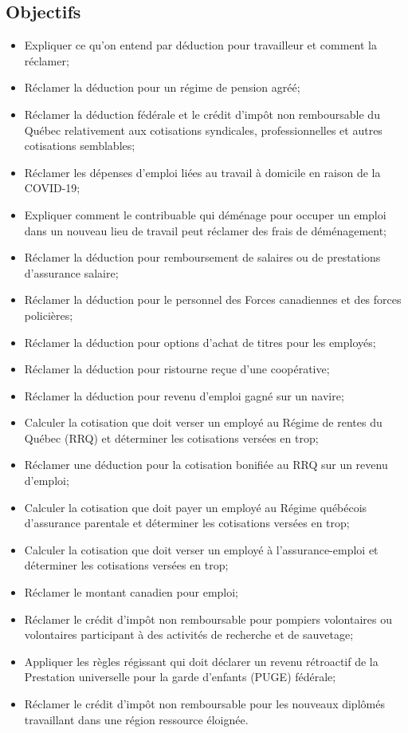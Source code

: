 \subsection{Objectifs}
\begin{itemize}
	\item Expliquer ce qu'on entend par déduction pour travailleur et comment la réclamer;
	\item Réclamer la déduction pour un régime de pension agréé;
	\item Réclamer la déduction fédérale et le crédit d'impôt non remboursable du Québec relativement aux cotisations syndicales, professionnelles et autres cotisations semblables;
	\item Réclamer les dépenses d'emploi liées au travail à domicile en raison de la COVID-19;
	\item Expliquer comment le contribuable qui déménage pour occuper un emploi dans un nouveau lieu de travail peut réclamer des frais de déménagement;
	\item Réclamer la déduction pour remboursement de salaires ou de prestations d'assurance salaire;
	\item Réclamer la déduction pour le personnel des Forces canadiennes et des forces policières;
	\item Réclamer la déduction pour options d'achat de titres pour les employés;
	\item Réclamer la déduction pour ristourne reçue d'une coopérative;
	\item Réclamer la déduction pour revenu d'emploi gagné sur un navire;
	\item Calculer la cotisation que doit verser un employé au Régime de rentes du Québec (RRQ) et déterminer les cotisations versées en trop;
	\item Réclamer une déduction pour la cotisation bonifiée au RRQ sur un revenu d'emploi; 
	\item Calculer la cotisation que doit payer un employé au Régime québécois d'assurance parentale et déterminer les cotisations versées en trop;
	\item Calculer la cotisation que doit verser un employé à l'assurance-emploi et déterminer les cotisations versées en trop;
	\item Réclamer le montant canadien pour emploi;
	\item Réclamer le crédit d'impôt non remboursable pour pompiers volontaires ou volontaires participant à des activités de recherche et de sauvetage;
	\item Appliquer les règles régissant qui doit déclarer un revenu rétroactif de la Prestation universelle pour la garde d'enfants (PUGE) fédérale; 
	\item Réclamer le crédit d'impôt non remboursable pour les nouveaux diplômés travaillant dans une région ressource éloignée.
\end{itemize}



